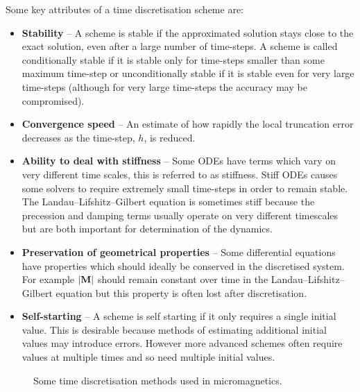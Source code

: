 Some key attributes of a time discretisation scheme are:\cite{Atkinson2009}
\begin{itemize}

\item \textbf{Stability} -- A scheme is stable if the approximated solution stays close to the exact solution, even after a large number of time-steps. A scheme is called conditionally stable if it is stable only for time-steps smaller than some maximum time-step or unconditionally stable if it is stable even for very large time-steps (although for very large time-steps the accuracy may be compromised).

\item \textbf{Convergence speed} -- An estimate of how rapidly the local truncation error decreases as the time-step, $h$, is reduced.

\item \textbf{Ability to deal with stiffness} -- Some ODEs have terms which vary on very different time scales, this is referred to as stiffness. Stiff ODEs causes some solvers to require extremely small time-steps in order to remain stable. The Landau--Lifshitz--Gilbert equation is sometimes stiff because the precession and damping terms usually operate on very different timescales but are both important for determination of the dynamics.\cite{Fidler2000}

\item \textbf{Preservation of geometrical properties} -- Some differential equations have properties which should ideally be conserved in the discretised system. For example $\lvert \mathbf{M} \rvert$ should remain constant over time in the Landau--Lifshitz--Gilbert equation but this property is often lost after discretisation.\cite{DAquino2005}

\item \textbf{Self-starting} -- A scheme is self starting if it only requires a single initial value. This is desirable because methods of estimating additional initial values may introduce errors. However more advanced schemes often require values at multiple times and so need multiple initial values.
\end{itemize}

\begin{figure}[h]
  \centering
  \caption{Some time discretisation methods  used in micromagnetics.}
  \label{fig:types-time-disc}
\end{figure}

